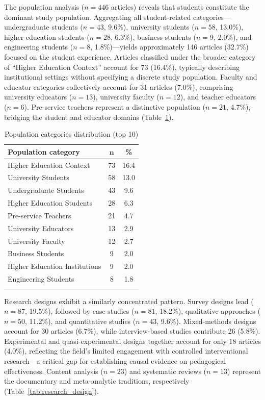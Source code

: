 \documentclass[pdflatex,sn-basic]{sn-jnl}%
\begin{document}
The population analysis ($n = 446$ articles) reveals that students constitute the dominant study population. Aggregating all student-related categories---undergraduate students ($n = 43$, 9.6\%), university students ($n = 58$, 13.0\%), higher education students ($n = 28$, 6.3\%), business students ($n = 9$, 2.0\%), and engineering students ($n = 8$, 1.8\%)---yields approximately 146 articles (32.7\%) focused on the student experience. Articles classified under the broader category of ``Higher Education Context'' account for 73 (16.4\%), typically describing institutional settings without specifying a discrete study population. Faculty and educator categories collectively account for 31 articles (7.0\%), comprising university educators ($n = 13$), university faculty ($n = 12$), and teacher educators ($n = 6$). Pre-service teachers represent a distinctive population ($n = 21$, 4.7\%), bridging the student and educator domains (Table~\ref{tab:populations}).

\begin{table}[htbp]
\centering
\caption{Population categories distribution (top 10)}\label{tab:populations}
\begin{tabular}{l c c}
\toprule
\textbf{Population category} & $\boldsymbol{n}$ & \textbf{\%} \\
\midrule
Higher Education Context & 73 & 16.4 \\
University Students & 58 & 13.0 \\
Undergraduate Students & 43 & 9.6 \\
Higher Education Students & 28 & 6.3 \\
Pre-service Teachers & 21 & 4.7 \\
University Educators & 13 & 2.9 \\
University Faculty & 12 & 2.7 \\
Business Students & 9 & 2.0 \\
Higher Education Institutions & 9 & 2.0 \\
Engineering Students & 8 & 1.8 \\
\botrule
\end{tabular}
\end{table}

Research designs exhibit a similarly concentrated pattern. Survey designs lead ($n = 87$, 19.5\%), followed by case studies ($n = 81$, 18.2\%), qualitative approaches ($n = 50$, 11.2\%), and quantitative studies ($n = 43$, 9.6\%). Mixed-methods designs account for 30 articles (6.7\%), while interview-based studies contribute 26 (5.8\%). Experimental and quasi-experimental designs together account for only 18 articles (4.0\%), reflecting the field's limited engagement with controlled interventional research---a critical gap for establishing causal evidence on pedagogical effectiveness. Content analysis ($n = 23$) and systematic reviews ($n = 13$) represent the documentary and meta-analytic traditions, respectively (Table~\ref{tab:research_design}).
\end{document}
